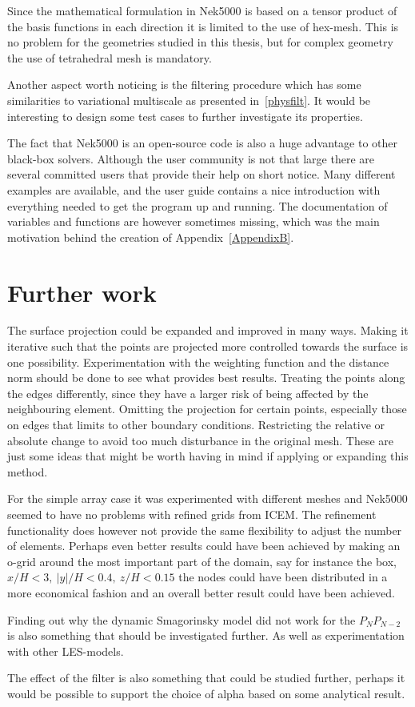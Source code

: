 Since the mathematical formulation in Nek5000 is based on a tensor product of the basis functions 
in each direction it is limited to the use of hex-mesh. This is no problem for the geometries 
studied in this thesis, but for complex geometry the use of tetrahedral mesh is mandatory.

Another aspect worth noticing is the filtering procedure which has some similarities to variational multiscale
as presented in~\cref{physfilt}. It would be interesting to design some test cases to further 
investigate its properties.  

The fact that Nek5000 is an open-source code is also a huge advantage to other black-box solvers. 
Although the user community is not that large there are several committed users that provide 
their help on short notice. Many different examples are available, and the user guide 
contains a nice introduction with everything needed to get the program up and running. 
The documentation of variables and functions are however sometimes missing, which was 
the main motivation behind the creation of Appendix~\ref{AppendixB}. 


\section{Further work}
The surface projection could be expanded and improved in many ways. Making it iterative 
such that the points are projected more controlled towards the surface is one possibility. 
Experimentation with the weighting function and the distance norm should be done to see 
what provides best results. Treating the points along the edges differently, since they 
have a larger risk of being affected by the neighbouring element. Omitting the projection 
for certain points, especially those on edges that limits to other boundary conditions.
Restricting the relative or absolute change to avoid too much disturbance in the original mesh. 
These are just some ideas that might be worth having in mind if applying or expanding this method.

For the simple array case it was experimented with different meshes and Nek5000 seemed to 
have no problems with refined grids from ICEM. The refinement functionality does however not 
provide the same flexibility to adjust the number of elements. Perhaps even better results could 
have been achieved by making an o-grid around the most important part of the domain,
say for instance the box, $x/H < 3,\: |y|/H < 0.4,\: z/H < 0.15$ the nodes could have been 
distributed in a more economical fashion and an overall better result could have been achieved.

Finding out why the dynamic Smagorinsky model did not work for the $P_NP_{N-2}$ is also 
something that should be investigated further. As well as experimentation with 
other LES-models. 

The effect of the filter is also something that could be studied further, perhaps it would 
be possible to support the choice of alpha based on some analytical result.
